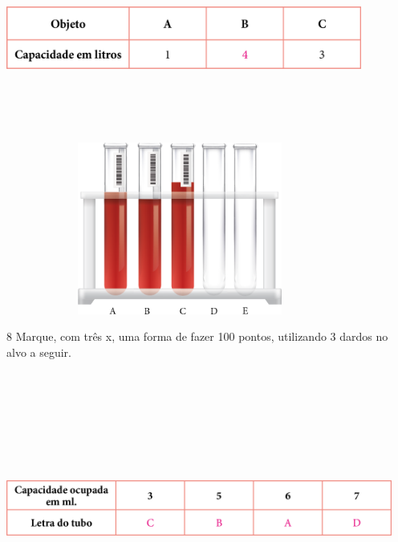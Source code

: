 \includegraphics[width=4.60417in,height=2.33333in]{media/image35.png}

\includegraphics[width=4.50000in,height=2.22917in]{media/image36.png}

\num{8} Marque, com três x, uma forma de fazer 100 pontos, utilizando 3 dardos no alvo a seguir.


\includegraphics[width=5.00000in,height=3.54167in]{media/image37.png}

